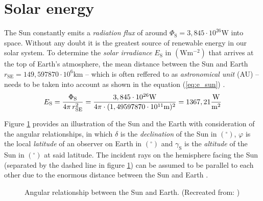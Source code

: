 \section{Solar energy} \label{sec:solar_energy}
The Sun constantly emits a \emph{radiation flux} of around $\Phi_{\mathrm{S}} = 3,845 \cdot 10^{26} \mathrm{W}$ into space. Without any doubt it is the greatest source of renewable energy in our solar system. To determine the \emph{solar irradiance} $E_\mathrm{S}$ in $\left( \mathrm{W} \mathrm{m}^{-2} \right)$ that arrives at the top of Earth's atmosphere, the mean distance between the Sun and Earth $r_{\mathrm{SE}} = 149,597870 \cdot 10^{6} \mathrm{km}$ -- which is often reffered to as \emph{astronomical unit} (AU) -- needs to be taken into account as shown in the equation (\ref{eq:e_sun}) \cite{Karttunen:2006, Bertol:2011, Mertens:2015, Wagner:2018}. 
	\begin{equation} \label{eq:e_sun}
	\centering
		E_{\mathrm{S}} = \frac{\Phi_{\mathrm{S}}}{4 \pi \, r_{\mathrm{SE}}^2} = \frac{3,845 \cdot 10^{26} \mathrm{W}}{4 \pi \cdot (1,49597870 \cdot 10^{11} \mathrm{m})^2} = 1367,21 \frac{\mathrm{W}}{\mathrm{m}^2}
	\end{equation}

Figure \ref{fig:tikz_angular_relationship} provides an illustration of the Sun and the Earth with consideration of the angular relationships, in which $\delta$ is the \emph{declination} of the Sun in $\left( ^\circ \right)$, $\varphi$ is the local \emph{latitude} of an observer on Earth in $\left( ^\circ \right)$ and $\gamma_{\mathrm{S}}$ is the \emph{altitude} of the Sun in $\left( ^\circ \right)$ at said latitude. The incident rays on the hemisphere facing the Sun (separated by the dashed line in figure \ref{fig:tikz_angular_relationship}) can be assumed to be parallel to each other due to the enormous distance between the Sun and Earth \cite{Landis:1995, Karttunen:2006, Mertens:2015, Wagner:2018}.
\begin{figure}[h!]
	\centering
	
	\caption{Angular relationship between the Sun and Earth. (Recreated from: \cite{Mertens:2015})}
	\label{fig:tikz_angular_relationship}
\end{figure} 


